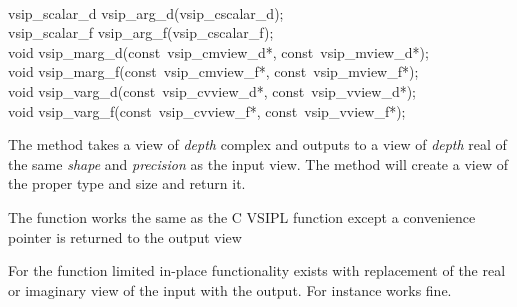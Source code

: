 \\\cvsiplh
\begin{cfuncs}
vsip\_scalar\_d vsip\_arg\_d(vsip\_cscalar\_d);\Bs\\
vsip\_scalar\_f vsip\_arg\_f(vsip\_cscalar\_f);\Bs\\
void vsip\_marg\_d(const~vsip\_cmview\_d*, const~vsip\_mview\_d*);\Bs\\
void vsip\_marg\_f(const~vsip\_cmview\_f*, const~vsip\_mview\_f*);\Bs\\
void vsip\_varg\_d(const~vsip\_cvview\_d*, const~vsip\_vview\_d*);\Bs\\
void vsip\_varg\_f(const~vsip\_cvview\_f*, const~vsip\_vview\_f*);\Bs\\
\end{cfuncs}
\pyjvsiph
{}
\begin{comments}
\item{The  method takes a view of \emph{depth} complex and outputs to a view of \emph{depth} real of the same \emph{shape} and \emph{precision} as the input view.
\subitem The  method will create a view of the proper type and size and return it.}
\item{The  function works the same as the C VSIPL function except a convenience pointer is returned to the output view}
\item{For the function limited in-place functionality exists with replacement of the real or imaginary view of the input with the output. For instance  works fine.}
\end{comments}